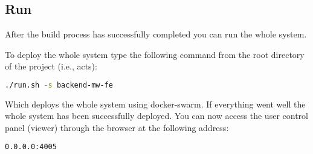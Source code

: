 \subsection{Run}

After the build process has successfully completed you can run the whole system.

To deploy the whole system type the following command from the root directory of the project (i.e., acts):

\begin{lstlisting}[language=bash]
./run.sh -s backend-mw-fe
\end{lstlisting}

Which deploys the whole system using docker-swarm.
If everything went well the whole system has been successfully deployed.
You can now access the user control panel (viewer) through the browser at the following address:

\begin{lstlisting}[language=bash]
0.0.0.0:4005
\end{lstlisting}